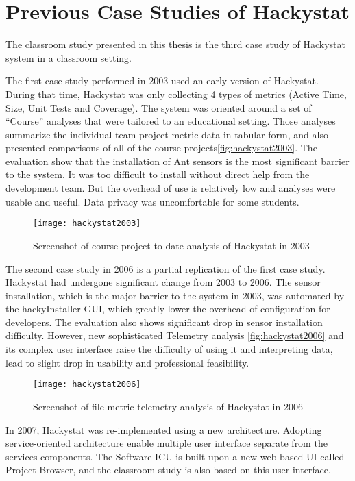 \section {Previous Case Studies of Hackystat}
The classroom study presented in this thesis is the third case study of Hackystat system in a classroom setting. 

The first case study performed in 2003 used an early version of Hackystat\cite{csdl2-03-13}. During that time, Hackystat was only collecting 4 types of metrics (Active Time, Size, Unit Tests and Coverage). The system was oriented around a set of ``Course'' analyses that were tailored to an educational setting. Those analyses summarize the individual team project metric data in tabular form, and also presented comparisons of all of the course projects\autoref{fig:hackystat2003}. The evaluation show that the installation of Ant sensors is the most significant barrier to the system. It was too difficult to install without direct help from the development team. But the overhead of use is relatively low and analyses were usable and useful. Data privacy was uncomfortable for some students.

\begin{figure}[htbp]
   \centering
   \texttt{[image: hackystat2003]} 
   \caption{Screenshot of course project to date analysis of Hackystat in 2003}
   \label{fig:hackystat2003}
\end{figure}

The second case study in 2006 is a partial replication of the first case study\cite{csdl2-07-02}. Hackystat had undergone significant change from 2003 to 2006. The sensor installation, which is the major barrier to the system in 2003, was automated by the hackyInstaller GUI, which greatly lower the overhead of configuration for developers. The evaluation also shows significant drop in sensor installation difficulty. However, new sophisticated Telemetry analysis \autoref{fig:hackystat2006} and its complex user interface raise the difficulty of using it and interpreting data, lead to slight drop in usability and professional feasibility.

\begin{figure}[htbp]
   \centering
   \texttt{[image: hackystat2006]} 
   \caption{Screenshot of file-metric telemetry analysis of Hackystat in 2006}
   \label{fig:hackystat2006}
\end{figure}

In 2007, Hackystat was re-implemented using a new architecture. Adopting service-oriented architecture enable  multiple user interface separate from the services components. The Software ICU is built upon a new web-based UI called Project Browser, and the classroom study is also based on this user interface.


